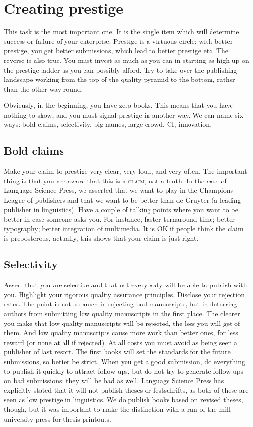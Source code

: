 \documentclass[output=guidelines,guidelines] {langscibook}
\begin{document}
\section{Creating prestige}
This task is the most important one. It is the single item which will determine success or failure of your enterprise. 
Prestige is a virtuous circle: with better prestige, you get better submissions, which lead to better prestige etc. The reverse is also true. You must invest as much as you can in starting as high up on the prestige ladder as you can possibly afford. Try to take over the publishing landscape working from the top of the quality pyramid to the bottom, rather than the other way round.

Obviously, in the beginning, you have zero books. This means that you have nothing to show, and you must signal prestige in another way. We can name six ways: %
bold claims, 
selectivity, 
big names, 
large crowd, 
CI, 
innovation. 

\subsection{Bold claims}
Make your claim to prestige very clear, very loud, and very often. The important thing is that you are aware that this is a \textsc{claim}, not a truth. In the case of Language Science Press, we asserted that we want to play in the Champions League of publishers and that we want to be better than de Gruyter (a leading publisher in linguistics). Have a couple of talking points where you want to be better in case someone asks you. For instance, faster turnaround time; better typography; better integration of multimedia. It is OK if people think the claim is preposterous, actually, this shows that your claim is just right. 

\subsection{Selectivity}
Assert that you are selective and that not everybody will be able to publish with you. Highlight your rigorous quality assurance principles. Disclose your rejection rates. The point is not so much in rejecting bad manuscripts, but in deterring authors from submitting low quality manuscripts in the first place. The clearer you make that low quality manuscripts will be rejected, the less you will get of them. And low quality manuscripts cause more work than better ones, for less reward (or none at all if rejected). 
At all costs you must avoid as being seen a publisher of last resort. The first books will set the standards for the future submissions, so better be strict. When you get a good submission, do everything to publish it quickly to attract follow-ups, but do not try to generate follow-ups on bad submissions: they will be bad as well. 
Language Science Press has explicitly stated that it will not publish theses or festschrifts, as both of these are seen as low prestige in linguistics. We do publish books based on revised theses, though, but it was important to make the distinction with a run-of-the-mill university press for thesis printouts.
\end{document}
